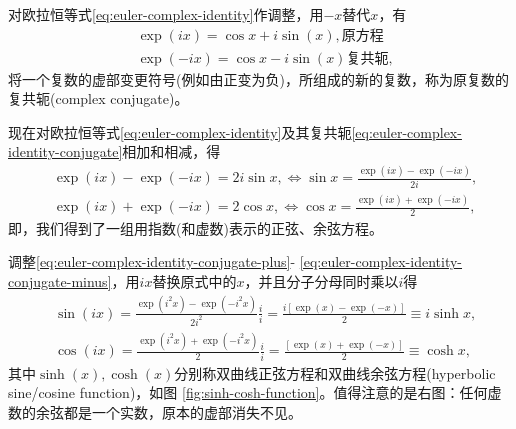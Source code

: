 \begin{subappendices}
对欧拉恒等式\eqref{eq:euler-complex-identity}作调整，用$-x$替代$x$，有
\begin{equation}
  \label{eq:euler-complex-identity-conjugate}
\begin{split}
  & \exp \left( i x \right) = \cos x + i \sin \left( x \right), \text{原方程}\\
  & \exp \left( - i x \right) = \cos x - i \sin \left( x \right) \text{复共轭},
\end{split}
\end{equation}
将一个复数的虚部变更符号(例如由正变为负)，所组成的新的复数，称为原复数的复共轭(complex conjugate)。

现在对欧拉恒等式\eqref{eq:euler-complex-identity}及其复共轭\eqref{eq:euler-complex-identity-conjugate}相加和相减，得
\begin{align}
  \label{eq:euler-complex-identity-conjugate-plus}
  & \exp \left( i x \right) - \exp \left( - i x \right) = 2 i \sin x,  \Longleftrightarrow \sin x = \frac{\exp \left( i x \right) - \exp \left( - i x \right)}{2 i}, \\
  \label{eq:euler-complex-identity-conjugate-minus}
  & \exp \left( i x \right) + \exp \left( - i x \right) = 2 \cos x, \Longleftrightarrow \cos x = \frac{\exp \left( i x \right) + \exp \left( - i x \right)}{2},
\end{align}
即，我们得到了一组用指数(和虚数)表示的正弦、余弦方程。

调整\eqref{eq:euler-complex-identity-conjugate-plus}-  \eqref{eq:euler-complex-identity-conjugate-minus}，用$ix$替换原式中的$x$，并且分子分母同时乘以$i$得
\begin{align}
  \label{eq:euler-complex-identity-conjugate-plus-i}
  & \sin \left( ix \right) = \frac{\exp \left( i^{2} x \right) - \exp \left( - i^{2} x \right)}{2 i^{2}} \frac{i}{i}
  = \frac{
  i \left[ \exp \left( x \right) - \exp \left( - x \right) \right]
  }{2} \equiv i \sinh x, \\
  \label{eq:euler-complex-identity-conjugate-minus-i}
  & \cos \left( ix \right) = \frac{\exp \left( i^{2} x \right) + \exp \left( - i^{2} x \right)}{2} \frac{i}{i} = \frac{
  \left[ \exp \left( x \right) + \exp \left( - x \right) \right]
  }{
  2
  } \equiv \cosh x,
\end{align}
其中$\sinh(x), \cosh(x)$分别称双曲线正弦方程和双曲线余弦方程(hyperbolic sine/cosine function)，如图  \ref{fig:sinh-cosh-function}。值得注意的是右图：任何虚数的余弦都是一个实数，原本的虚部消失不见。


\end{subappendices}
